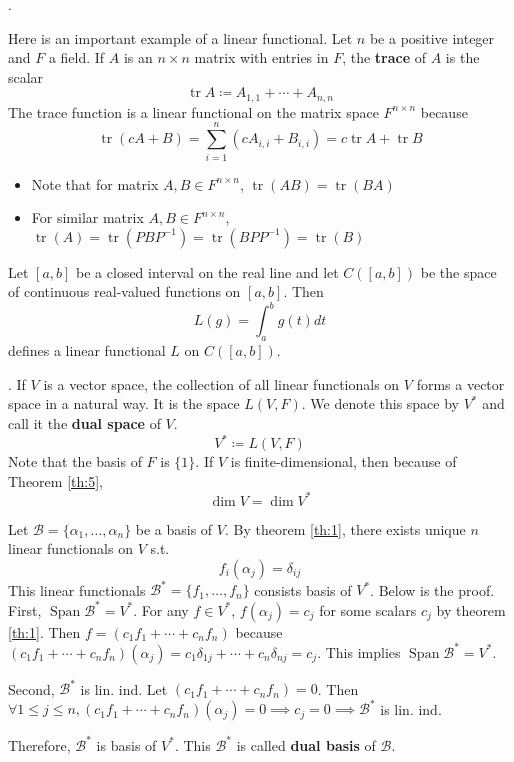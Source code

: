 \documentclass[8pt]{beamer}
\newcommand{\mc}[1]{\mathcal{#1}}
\newcommand{\tb}[1]{\textbf{#1}}
\newcommand{\Span}{\operatorname{Span}}
\newcommand{\tr}{\operatorname{tr}}
\begin{document}
\begin{frame}{.}
    \begin{example}
        Here is an important example of a linear functional.
        Let $n$ be a positive integer and $F$ a field.
        If $A$ is an $n \times n$ matrix with entries in $F$, the \tb{trace} of $A$ is the scalar
        \[
        \tr A \coloneq A_{1,1} + \cdots + A_{n, n}
        \]
        The trace function is a linear functional on the matrix space $F^{n \times n}$ because
        \[
            \tr (cA +B)= \sum_{i=1}^n (cA_{i,i} + B_{i,i}) = c \tr A + \tr B
        \]
    \end{example}

    \begin{itemize}
        \item Note that for matrix $A,B \in F^{n \times n}$, $\tr(AB) = \tr(BA)$
        \item For similar matrix $A,B \in F^{n \times n}$, $\tr(A) = \tr(PBP^{-1}) = \tr(BPP^{-1}) = \tr(B)$
    \end{itemize}

    \begin{example}
        Let $[a,b]$ be a closed interval on the real line and let $C([a,b])$ be the space of continuous real-valued functions on $[a,b]$.
        Then
        \[L(g) = \int_a^b g(t) dt\]
        defines a linear functional $L$ on $C([a,b])$.
    \end{example}
\end{frame}

\begin{frame}{.}
    If $V$ is a vector space, the collection of all linear functionals on $V$ forms a vector space in a natural way.
    It is the space $L(V,F)$.
    We denote this space by $V^\ast$ and call it the \tb{dual space} of $V$.
    \[
        V^\ast \coloneq L(V,F)
    \]
    Note that the basis of $F$ is $\{1\}$.
    If $V$ is finite-dimensional, then because of Theorem \ref{th:5}, \[\dim V = \dim V^\ast\] 

    \bigskip
    Let $\mc{B} = \{\alpha_1, \dots, \alpha_n\}$ be a basis of $V$.
    By theorem \ref{th:1}, there exists unique $n$ linear functionals on $V$ s.t.
    \[
        f_i (\alpha_j) = \delta_{ij}
    \]
    This linear functionals $\mc{B}^\ast = \{f_1, \dots , f_n\}$ consists basis of $V^\ast$.
    Below is the proof.
    First, $\Span \mc{B^\ast} = V^\ast$.
    For any $f \in V^\ast$, $f(\alpha_j) = c_j$ for some scalars $c_j$ by theorem \ref{th:1}.
    Then $f = (c_1 f_1 + \cdots + c_n f_n)$ because $(c_1 f_1 + \cdots + c_n f_n)(\alpha_j) = c_1 \delta_{1j} + \cdots + c_n \delta_{nj} = c_j$.
    This implies $\Span \mc{B}^\ast = V^\ast$.

    \smallskip
    Second, $\mc{B}^\ast$ is lin. ind.
    Let $(c_1 f_1 + \cdots + c_n f_n) = 0$. Then $\forall 1 \leq j \leq n, (c_1 f_1 + \cdots + c_n f_n)(\alpha_j) = 0 \implies c_j = 0 \implies \mc{B}^\ast$ is lin. ind.

    \smallskip
    Therefore, $\mc{B}^\ast$ is basis of $V^\ast$.
    This $\mc{B}^\ast$ is called \tb{dual basis} of $\mc{B}$.
\end{frame}
\end{document}
